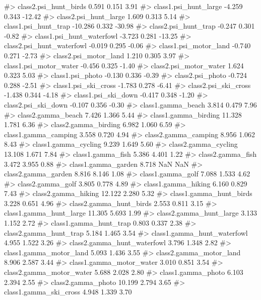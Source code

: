 \begin{Schunk}
\begin{Soutput}
#> class2.psi_hunt_birds          0.591   0.151   3.91
#> class1.psi_hunt_large         -4.259   0.343 -12.42
#> class2.psi_hunt_large          1.609   0.313   5.14
#> class1.psi_hunt_trap         -10.286   0.332 -30.98
#> class2.psi_hunt_trap          -0.247   0.301  -0.82
#> class1.psi_hunt_waterfowl     -3.723   0.281 -13.25
#> class2.psi_hunt_waterfowl     -0.019   0.295  -0.06
#> class1.psi_motor_land         -0.740   0.271  -2.73
#> class2.psi_motor_land          1.210   0.305   3.97
#> class1.psi_motor_water        -0.456   0.325  -1.40
#> class2.psi_motor_water         1.624   0.323   5.03
#> class1.psi_photo              -0.130   0.336  -0.39
#> class2.psi_photo              -0.724   0.288  -2.51
#> class1.psi_ski_cross          -1.783   0.278  -6.41
#> class2.psi_ski_cross          -1.438   0.344  -4.18
#> class1.psi_ski_down           -0.417   0.348  -1.20
#> class2.psi_ski_down           -0.107   0.356  -0.30
#> class1.gamma_beach             3.814   0.479   7.96
#> class2.gamma_beach             7.426   1.366   5.44
#> class1.gamma_birding          11.328   1.781   6.36
#> class2.gamma_birding           6.982   1.060   6.59
#> class1.gamma_camping           3.558   0.720   4.94
#> class2.gamma_camping           8.956   1.062   8.43
#> class1.gamma_cycling           9.239   1.649   5.60
#> class2.gamma_cycling          13.108   1.671   7.84
#> class1.gamma_fish              5.386   4.401   1.22
#> class2.gamma_fish              3.472   3.955   0.88
#> class1.gamma_garden            8.718     NaN    NaN
#> class2.gamma_garden            8.816   8.146   1.08
#> class1.gamma_golf              7.088   1.533   4.62
#> class2.gamma_golf              3.805   0.778   4.89
#> class1.gamma_hiking            6.160   0.829   7.43
#> class2.gamma_hiking           12.122   2.280   5.32
#> class1.gamma_hunt_birds        3.228   0.651   4.96
#> class2.gamma_hunt_birds        2.553   0.811   3.15
#> class1.gamma_hunt_large       11.305   5.693   1.99
#> class2.gamma_hunt_large        3.133   1.152   2.72
#> class1.gamma_hunt_trap         0.803   0.337   2.38
#> class2.gamma_hunt_trap         5.184   1.465   3.54
#> class1.gamma_hunt_waterfowl    4.955   1.522   3.26
#> class2.gamma_hunt_waterfowl    3.796   1.348   2.82
#> class1.gamma_motor_land        5.093   1.436   3.55
#> class2.gamma_motor_land        8.906   2.587   3.44
#> class1.gamma_motor_water       3.010   0.851   3.54
#> class2.gamma_motor_water       5.688   2.028   2.80
#> class1.gamma_photo             6.103   2.394   2.55
#> class2.gamma_photo            10.199   2.794   3.65
#> class1.gamma_ski_cross         4.948   1.339   3.70

\end{Soutput}
\end{Schunk}
